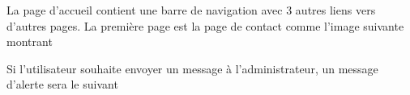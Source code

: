 \documentclass{article}
\begin{document}
\begin{enumerate}
\newpage
   La page d'accueil contient une barre de navigation avec 3 autres liens vers d'autres pages.
La première page est la page de contact comme l'image suivante montrant
  
\vspace{0.7cm}
   

   \hspace*{-0.7in}
               \noindent{} 
               
               
Si l'utilisateur souhaite envoyer un message à l'administrateur, un message d'alerte sera le suivant
  
  
  \vspace{0.7cm}
               \hspace*{-0.7in}
               \noindent{} 
  

\end{enumerate}
\end{document}
